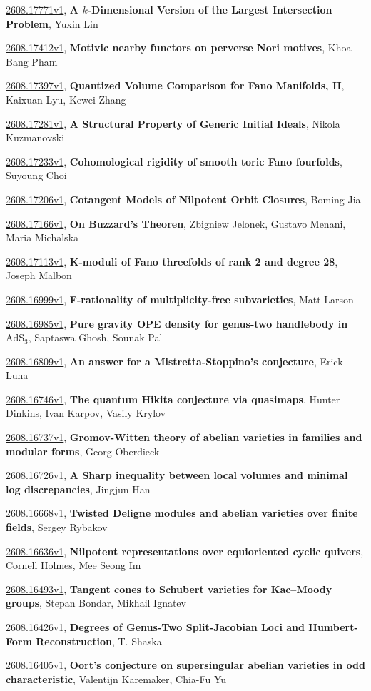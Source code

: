 \documentclass[9pt, a4paper]{article}
\theoremstyle{plain}
\theoremstyle{definition}
\theoremstyle{remark}
\newcommand{\arxiv}[3]{\href{https://arxiv.org/abs/#1}{#1}, \textbf{\textcolor{arxivblue}{#2}}, #3}
\begin{document}
\arxiv{2608.17771v1}{A $k$-Dimensional Version of the Largest Intersection Problem}{Yuxin Lin}

\arxiv{2608.17412v1}{Motivic nearby functors on perverse Nori motives}{Khoa Bang Pham}

\arxiv{2608.17397v1}{Quantized Volume Comparison for Fano Manifolds, II}{Kaixuan Lyu, Kewei Zhang}

\arxiv{2608.17281v1}{A Structural Property of Generic Initial Ideals}{Nikola Kuzmanovski}

\arxiv{2608.17233v1}{Cohomological rigidity of smooth toric Fano fourfolds}{Suyoung Choi}

\arxiv{2608.17206v1}{Cotangent Models of Nilpotent Orbit Closures}{Boming Jia}

\arxiv{2608.17166v1}{On Buzzard's Theoren}{Zbigniew Jelonek, Gustavo Menani, Maria Michalska}

\arxiv{2608.17113v1}{K-moduli of Fano threefolds of rank 2 and degree 28}{Joseph Malbon}

\arxiv{2608.16999v1}{F-rationality of multiplicity-free subvarieties}{Matt Larson}

\arxiv{2608.16985v1}{Pure gravity OPE density for genus-two handlebody in $\text{AdS}_3$}{Saptaswa Ghosh, Sounak Pal}

\arxiv{2608.16809v1}{An answer for a Mistretta-Stoppino's conjecture}{Erick Luna}

\arxiv{2608.16746v1}{The quantum Hikita conjecture via quasimaps}{Hunter Dinkins, Ivan Karpov, Vasily Krylov}

\arxiv{2608.16737v1}{Gromov-Witten theory of abelian varieties in families and modular forms}{Georg Oberdieck}

\arxiv{2608.16726v1}{A Sharp inequality between local volumes and minimal log discrepancies}{Jingjun Han}

\arxiv{2608.16668v1}{Twisted Deligne modules and abelian varieties over finite fields}{Sergey Rybakov}

\arxiv{2608.16636v1}{Nilpotent representations over equioriented cyclic quivers}{Cornell Holmes, Mee Seong Im}

\arxiv{2608.16493v1}{Tangent cones to Schubert varieties for Kac--Moody groups}{Stepan Bondar, Mikhail Ignatev}

\arxiv{2608.16426v1}{Degrees of Genus-Two Split-Jacobian Loci and Humbert-Form Reconstruction}{T. Shaska}

\arxiv{2608.16405v1}{Oort's conjecture on supersingular abelian varieties in odd characteristic}{Valentijn Karemaker, Chia-Fu Yu}
\end{document}
